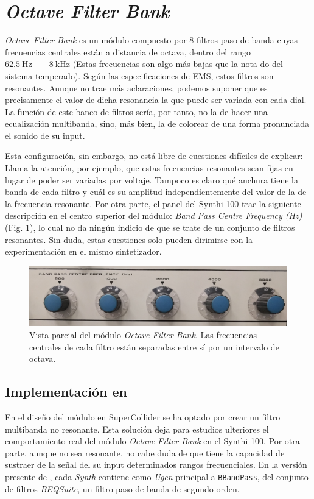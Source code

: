 \section{\textit{Octave Filter Bank}}

\textit{Octave Filter Bank} es un módulo compuesto por 8 filtros paso de banda cuyas frecuencias centrales están a distancia de octava, dentro del rango  $\SI{62.5}{\hertz}--\SI{8}{\kilo\hertz}$ (Estas frecuencias son algo más bajas que la nota do del sistema temperado). Según las especificaciones de EMS, estos filtros son resonantes. Aunque no trae más aclaraciones, podemos suponer que es precisamente el valor de dicha resonancia la que puede ser variada con cada dial. La función de este banco de filtros sería, por tanto, no la de hacer una ecualización multibanda, sino, más bien, la de colorear de una forma pronunciada el sonido de su input.

Esta configuración, sin embargo, no está libre de cuestiones difíciles de explicar: Llama la atención, por ejemplo, que estas frecuencias resonantes sean fijas en lugar de poder ser variadas por voltaje. Tampoco es claro qué anchura tiene la banda de cada filtro y cuál es su amplitud independientemente del valor de la de la frecuencia resonante. Por otra parte, el panel del Synthi 100 trae la siguiente descripción en el centro superior del módulo: \textit{Band Pass Centre Frequency (Hz)} (Fig. \ref{fig:octave_filter_bank}), lo cual no da ningún indicio de que se trate de un conjunto de filtros resonantes. Sin duda, estas cuestiones solo pueden dirimirse con la experimentación en el mismo sintetizador.

\begin{figure}
	\centering
	\includegraphics[width=1\textwidth]{images/octave_filter_bank}
	\caption[Módulo \textit{Octave Filter Bank}]{Vista parcial del módulo \textit{Octave Filter Bank}. Las frecuencias centrales de cada filtro están separadas entre sí por un intervalo de octava.}
	\label{fig:octave_filter_bank}
\end{figure}

\subsection{Implementación en \appName}

En el diseño del módulo en SuperCollider se ha optado por crear un filtro multibanda no resonante. Esta solución deja para estudios ulteriores el comportamiento real del módulo \textit{Octave Filter Bank} en el Synthi 100. Por otra parte, aunque no sea resonante, no cabe duda de que tiene la capacidad de sustraer de la señal del su input determinados rangos frecuenciales. En la versión presente de \appName, cada \textit{Synth} contiene como \textit{Ugen} principal a \texttt{BBandPass}, del conjunto de filtros \textit{BEQSuite}, un filtro paso de banda de segundo orden.


